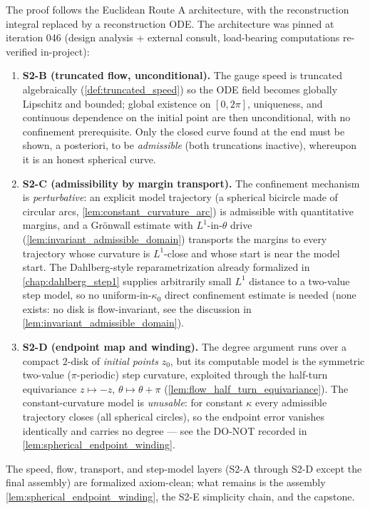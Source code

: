 The proof follows the Euclidean Route A architecture, with the reconstruction integral
replaced by a reconstruction ODE. The architecture was pinned at iteration 046
(design analysis + external consult, load-bearing computations re-verified in-project):
\begin{enumerate}
\item \textbf{S2-B (truncated flow, unconditional).} The gauge speed is truncated
  algebraically (\cref{def:truncated_speed}) so the ODE field becomes globally
  Lipschitz and bounded; global existence on $[0,2\pi]$, uniqueness, and continuous
  dependence on the initial point are then unconditional, with no confinement
  prerequisite. Only the closed curve found at the end must be shown, a posteriori, to
  be \emph{admissible} (both truncations inactive), whereupon it is an honest spherical
  curve.
\item \textbf{S2-C (admissibility by margin transport).} The confinement mechanism is
  \emph{perturbative}: an explicit model trajectory (a spherical bicircle made of
  circular arcs, \cref{lem:constant_curvature_arc}) is admissible with quantitative
  margins, and a Gr\"onwall estimate with $L^1$-in-$\theta$ drive
  (\cref{lem:invariant_admissible_domain}) transports the margins to every trajectory
  whose curvature is $L^1$-close and whose start is near the model start. The
  Dahlberg-style reparametrization already formalized in \cref{chap:dahlberg_step1}
  supplies arbitrarily small $L^1$ distance to a two-value step model, so no
  uniform-in-$\kappa_0$ direct confinement estimate is needed (none exists: no disk is
  flow-invariant, see the discussion in \cref{lem:invariant_admissible_domain}).
\item \textbf{S2-D (endpoint map and winding).} The degree argument runs over a compact
  $2$-disk of \emph{initial points} $z_0$, but its computable model is the symmetric
  two-value ($\pi$-periodic) step curvature, exploited through the half-turn
  equivariance $z\mapsto -z$, $\theta\mapsto\theta+\pi$
  (\cref{lem:flow_half_turn_equivariance}). The constant-curvature model is
  \emph{unusable}: for constant $\kappa$ every admissible trajectory closes (all
  spherical circles), so the endpoint error vanishes identically and carries no degree
  — see the DO-NOT recorded in \cref{lem:spherical_endpoint_winding}.
\end{enumerate}
The speed, flow, transport, and step-model layers (S2-A through S2-D except the final
assembly) are formalized axiom-clean; what remains is the assembly
\cref{lem:spherical_endpoint_winding}, the S2-E simplicity chain, and the capstone.

